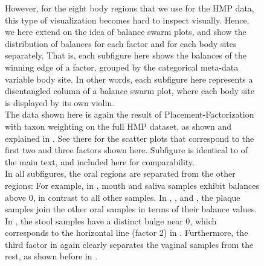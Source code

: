 \begin{figure}[!htb]
{        However, for the eight body regions that we use for the \ac{HMP} data,
        this type of visualization becomes hard to inspect visually.
        Hence, we here extend on the idea of balance swarm plots,
        and show the distribution of balances for each factor and for each body sites separately.
        That is, each subfigure here shows the balances of the winning edge of a factor,
        grouped by the categorical meta-data variable body site.
        In other words, each subfigure here represents a disentangled column of a balance swarm plot,
        where each body site is displayed by its own violin. %
        \\
        The data shown here is again the result of Placement-Factorization with taxon weighting on the full \ac{HMP} dataset,
        as shown and explained in .
        See there for the scatter plots that correspond to the first two and three factors shown here.
        Subfigure  is identical to 
        of the main text, and included here for comparability.
        \\
        In all subfigures, the oral regions are separated from the other regions:
        For example, in ,
        mouth and saliva samples exhibit balances above \num{0}, in contrast to all other samples.
        In , , and
        ,
        the plaque samples join the other oral samples in terms of their balance values.
        In , the stool samples have a distinct bulge near \num{0},
        which corresponds to the horizontal line (factor 2)
        in .
        Furthermore, the third factor in 
        again clearly separates the vaginal samples from the rest,
        as shown before in .
    }
    \label{supp:fig:hmp_pf_all_violins}
\end{figure}
